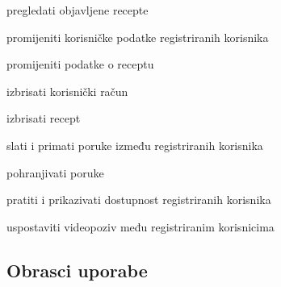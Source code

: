 \begin{packed_enum}
				\item{}
				\begin{packed_enum}
					\item pregledati objavljene recepte
					\item promijeniti korisničke podatke registriranih korisnika
					\item promijeniti podatke o receptu
					\item izbrisati korisnički račun
					\item izbrisati recept
				\end{packed_enum}

				\item{}
				\begin{packed_enum}
					\item slati i primati poruke između registriranih korisnika
					\item pohranjivati poruke
					\item pratiti i prikazivati dostupnost registriranih korisnika
					\item uspostaviti videopoziv među registriranim korisnicima
				\end{packed_enum}
			
			\end{packed_enum}
			
			\eject 
			
			
				
			\subsection{Obrasci uporabe}

